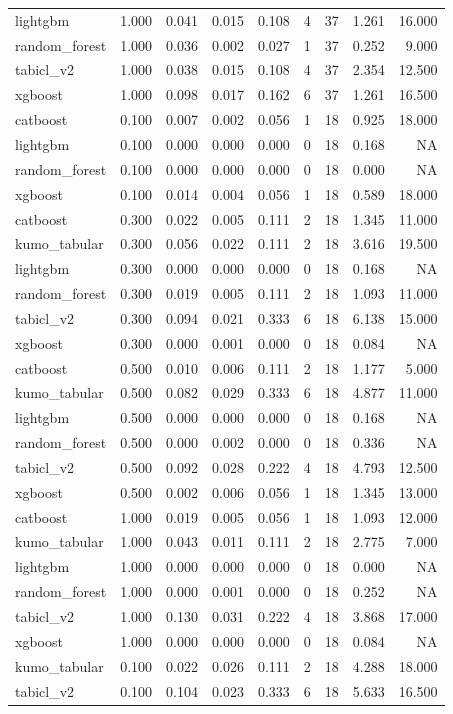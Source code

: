 \begin{table}
\begin{tabular}{lrrrrrrrr}
lightgbm & 1.000 & 0.041 & 0.015 & 0.108 & 4 & 37 & 1.261 & 16.000 \\
random\_forest & 1.000 & 0.036 & 0.002 & 0.027 & 1 & 37 & 0.252 & 9.000 \\
tabicl\_v2 & 1.000 & 0.038 & 0.015 & 0.108 & 4 & 37 & 2.354 & 12.500 \\
xgboost & 1.000 & 0.098 & 0.017 & 0.162 & 6 & 37 & 1.261 & 16.500 \\
catboost & 0.100 & 0.007 & 0.002 & 0.056 & 1 & 18 & 0.925 & 18.000 \\
lightgbm & 0.100 & 0.000 & 0.000 & 0.000 & 0 & 18 & 0.168 & NA \\
random\_forest & 0.100 & 0.000 & 0.000 & 0.000 & 0 & 18 & 0.000 & NA \\
xgboost & 0.100 & 0.014 & 0.004 & 0.056 & 1 & 18 & 0.589 & 18.000 \\
catboost & 0.300 & 0.022 & 0.005 & 0.111 & 2 & 18 & 1.345 & 11.000 \\
kumo\_tabular & 0.300 & 0.056 & 0.022 & 0.111 & 2 & 18 & 3.616 & 19.500 \\
lightgbm & 0.300 & 0.000 & 0.000 & 0.000 & 0 & 18 & 0.168 & NA \\
random\_forest & 0.300 & 0.019 & 0.005 & 0.111 & 2 & 18 & 1.093 & 11.000 \\
tabicl\_v2 & 0.300 & 0.094 & 0.021 & 0.333 & 6 & 18 & 6.138 & 15.000 \\
xgboost & 0.300 & 0.000 & 0.001 & 0.000 & 0 & 18 & 0.084 & NA \\
catboost & 0.500 & 0.010 & 0.006 & 0.111 & 2 & 18 & 1.177 & 5.000 \\
kumo\_tabular & 0.500 & 0.082 & 0.029 & 0.333 & 6 & 18 & 4.877 & 11.000 \\
lightgbm & 0.500 & 0.000 & 0.000 & 0.000 & 0 & 18 & 0.168 & NA \\
random\_forest & 0.500 & 0.000 & 0.002 & 0.000 & 0 & 18 & 0.336 & NA \\
tabicl\_v2 & 0.500 & 0.092 & 0.028 & 0.222 & 4 & 18 & 4.793 & 12.500 \\
xgboost & 0.500 & 0.002 & 0.006 & 0.056 & 1 & 18 & 1.345 & 13.000 \\
catboost & 1.000 & 0.019 & 0.005 & 0.056 & 1 & 18 & 1.093 & 12.000 \\
kumo\_tabular & 1.000 & 0.043 & 0.011 & 0.111 & 2 & 18 & 2.775 & 7.000 \\
lightgbm & 1.000 & 0.000 & 0.000 & 0.000 & 0 & 18 & 0.000 & NA \\
random\_forest & 1.000 & 0.000 & 0.001 & 0.000 & 0 & 18 & 0.252 & NA \\
tabicl\_v2 & 1.000 & 0.130 & 0.031 & 0.222 & 4 & 18 & 3.868 & 17.000 \\
xgboost & 1.000 & 0.000 & 0.000 & 0.000 & 0 & 18 & 0.084 & NA \\
kumo\_tabular & 0.100 & 0.022 & 0.026 & 0.111 & 2 & 18 & 4.288 & 18.000 \\
tabicl\_v2 & 0.100 & 0.104 & 0.023 & 0.333 & 6 & 18 & 5.633 & 16.500 \\
\bottomrule
\end{tabular}
\end{table}
